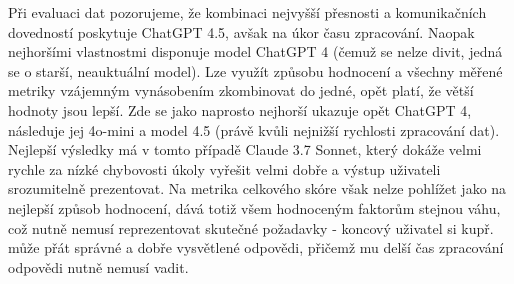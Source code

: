 \documentclass[czech,11pt,a4paper]{article}
\begin{document}
\begin{multicols}{2}
\begin{figure}[H]
			\label{fig:plot2}
		\end{figure}
		Při evaluaci dat pozorujeme, že kombinaci nejvyšší přesnosti a komunikačních dovedností poskytuje ChatGPT 4.5, avšak na úkor času zpracování. Naopak nejhoršími vlastnostmi disponuje model ChatGPT 4 (čemuž se nelze divit, jedná se o starší, neauktuální model). Lze využít způsobu hodnocení a všechny měřené metriky vzájemným vynásobením zkombinovat do jedné, opět platí, že větší hodnoty jsou lepší. Zde se jako naprosto nejhorší ukazuje opět ChatGPT 4, následuje jej 4o-mini a model 4.5 (právě kvůli nejnižší rychlosti zpracování dat). Nejlepší výsledky má v tomto případě Claude 3.7 Sonnet, který dokáže velmi rychle za nízké chybovosti úkoly vyřešit velmi dobře a výstup uživateli srozumitelně prezentovat. Na metrika celkového skóre však nelze pohlížet jako na nejlepší způsob hodnocení, dává totiž všem hodnoceným faktorům stejnou váhu, což nutně nemusí reprezentovat skutečné požadavky - koncový uživatel si kupř. může přát správné a dobře vysvětlené odpovědi, přičemž mu delší čas zpracování odpovědi nutně nemusí vadit.
		

\end{multicols}
\end{document}
